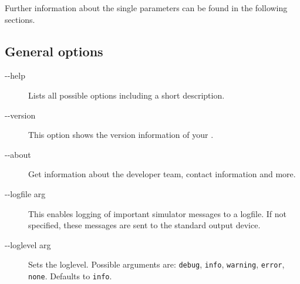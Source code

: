Further information about the single parameters can be found in the following sections.

\subsection{General options}
\begin{description}
	\item [-{}-help] Lists all possible options including a short description.
	\item [-{}-version] This option shows the version information of your \RSS.
	\item [-{}-about] Get information about the developer team, contact information and more.
	\item [-{}-logfile arg] This enables logging of important simulator messages to a logfile. If not specified, these messages are sent to the standard output device.
	\item [-{}-loglevel arg] Sets the loglevel. Possible arguments are: \texttt{debug}, \texttt{info}, \texttt{warning}, \texttt{error}, \texttt{none}. Defaults to \texttt{info}.
\end{description}

